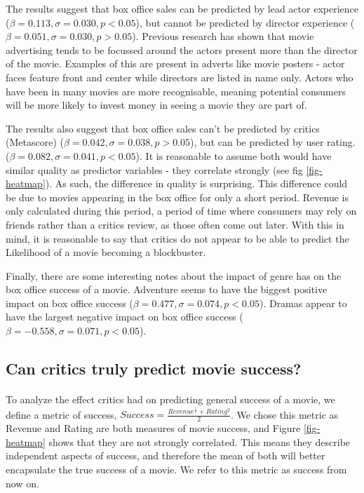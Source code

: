         The results suggest that box office sales can be predicted by lead actor experience ($\beta=0.113, \sigma=0.030, p<0.05$),
            but cannot be predicted by director experience ($\beta=0.051, \sigma=0.030, p>0.05$).
        Previous research has shown that movie advertising tends to be focussed around the actors 
            present more than the director of the movie\cite{elberse2007power}.
        Examples of this are present in adverts like movie posters - actor faces feature front and 
            center while directors are listed in name only.
        Actors who have been in many movies are more recognisable, meaning potential consumers
            will be more likely to invest money in seeing a movie they are part of.

        The results also suggest that box office sales can't be predicted by critics (Metascore) 
            ($\beta=0.042, \sigma=0.038, p>0.05$), but can be predicted by user rating.
            ($\beta=0.082, \sigma=0.041, p<0.05$).
        It is reasonable to assume both would have similar quality as predictor variables - they 
            correlate strongly (see fig \ref{fig-heatmap}).
        As such, the difference in quality is surprising.
        This difference could be due to movies appearing in the box office for only a short period.
        Revenue is only calculated during this period, a period of time where consumers may 
            rely on friends rather than a critics review, as those often come out later.
        With this in mind, it is reasonable to say that critics do not appear to be able to predict the Likelihood
            of a movie becoming a blockbuster.
        
        Finally, there are some interesting notes about the impact of genre has on the box office success of a movie.
        Adventure seems to have the biggest positive impact on box office success ($\beta=0.477,\sigma=0.074,p<0.05$).
        Dramas appear to have the largest negative impact on box office success ($\beta=-0.558,\sigma=0.071,p<0.05$).
    \subsection{Can critics truly predict movie success?}
        \paragraph{}
        To analyze the effect critics had on predicting general success of a movie, we define
            a metric of success, $Success = \frac{Revenue^\frac{1}{3} + Rating^2}{2}$.
        We chose this metric as Revenue and Rating are both measures of movie success,
            and Figure \ref{fig-heatmap} shows that they are not strongly correlated.
        This means they describe independent aspects of success, and therefore the mean of both
            will better encapsulate the true success of a movie.
        We refer to this metric as success from now on.
        
